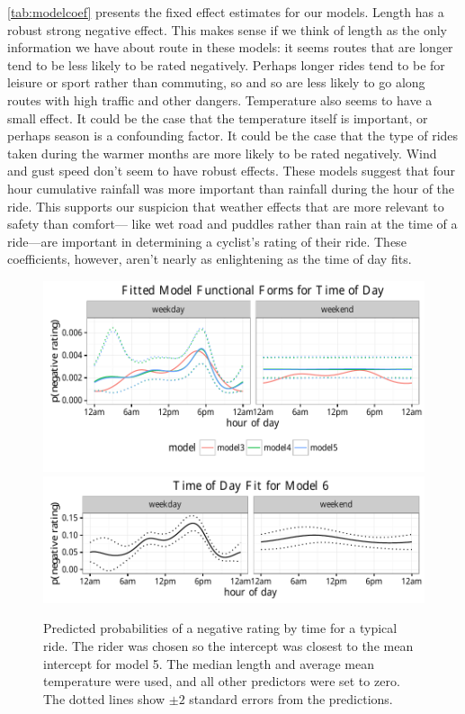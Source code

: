 \documentclass[12pt,twoside]{reedthesis}
\begin{document}
  \autoref{tab:modelcoef} presents the fixed effect estimates for our
  models. Length has a robust strong negative effect. This makes sense if
  we think of length as the only information we have about route in these
  models: it seems routes that are longer tend to be less likely to be
  rated negatively. Perhaps longer rides tend to be for leisure or sport
  rather than commuting, so and so are less likely to go along routes with
  high traffic and other dangers. Temperature also seems to have a small
  effect. It could be the case that the temperature itself is important,
  or perhaps season is a confounding factor. It could be the case that the
  type of rides taken during the warmer months are more likely to be rated
  negatively. Wind and gust speed don't seem to have robust effects. These
  models suggest that four hour cumulative rainfall was more important
  than rainfall during the hour of the ride. This supports our suspicion
  that weather effects that are more relevant to safety than comfort---
  like wet road and puddles rather than rain at the time of a ride---are
  important in determining a cyclist's rating of their ride. These
  coefficients, however, aren't nearly as enlightening as the time of day
  fits.
  
  \begin{figure}[htb]
  \centering
  \includegraphics{figure/time_fit_plot.pdf}
  \includegraphics{figure/time_fit_plot_6.pdf}
  \caption[Predicted probabilities of a negative rating by time for a typical ride]{
  Predicted probabilities of a negative rating by time for a typical ride.
  The rider was chosen so the intercept was closest to the mean intercept for model
  5. The median length and average mean temperature were used, and all other
  predictors were set to zero. The dotted lines show $\pm 2$ standard errors from
  the predictions.\label{fig:model-time-fit}}
  \end{figure}
  
\end{document}
